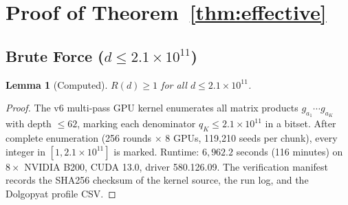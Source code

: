 \documentclass[11pt,a4paper]{amsart}
\newtheorem{lemma}[theorem]{Lemma}
\theoremstyle{definition}
\begin{document}
\section{Proof of Theorem~\ref{thm:effective}}

\subsection{Brute Force ($d \leq 2.1 \times 10^{11}$)}

\begin{lemma}[Computed]\label{lem:bruteforce}
$R(d) \geq 1$ for all $d \leq 2.1 \times 10^{11}$.
\end{lemma}

\begin{proof}
The v6 multi-pass GPU kernel enumerates all matrix products $g_{a_1} \cdots g_{a_K}$ with depth $\leq 62$, marking each denominator $q_K \leq 2.1 \times 10^{11}$ in a bitset. After complete enumeration (256 rounds $\times$ 8 GPUs, 119{,}210 seeds per chunk), every integer in $[1, 2.1 \times 10^{11}]$ is marked. Runtime: $6{,}962.2$ seconds (116 minutes) on $8\times$ NVIDIA B200, CUDA 13.0, driver 580.126.09. The verification manifest records the SHA256 checksum of the kernel source, the run log, and the Dolgopyat profile CSV.


\end{proof}
\end{document}
